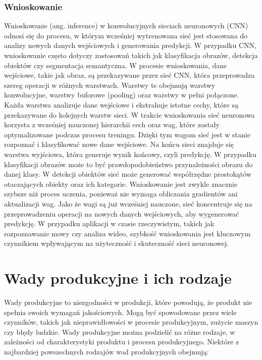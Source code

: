 \subsubsection{Wnioskowanie}
Wnioskowanie (ang. inference) w konwolucyjnych sieciach neuronowych (CNN) odnosi się do procesu, w którym wcześniej wytrenowana sieć jest stosowana do analizy nowych danych wejściowych i generowania predykcji. W przypadku CNN, wnioskowanie często dotyczy zastosowań takich jak klasyfikacja obrazów, detekcja obiektów czy segmentacja semantyczna.
W procesie wnioskowania, dane wejściowe, takie jak obraz, są przekazywane przez sieć CNN, która przeprowadza szereg operacji w różnych warstwach. Warstwy te obejmują warstwy konwolucyjne, warstwy buforowe (pooling) oraz warstwy w pełni połączone. Każda warstwa analizuje dane wejściowe i ekstrahuje istotne cechy, które są przekazywane do kolejnych warstw sieci.
W trakcie wnioskowania sieć neuronowa korzysta z wcześniej nauczonej hierarchii cech oraz wag, które zostały optymalizowane podczas procesu treningu. Dzięki tym wagom sieć jest w stanie rozpoznać i klasyfikować nowe dane wejściowe.
Na końcu sieci znajduje się warstwa wyjściowa, która generuje wynik końcowy, czyli predykcję. W przypadku klasyfikacji obrazów może to być prawdopodobieństwo przynależności obrazu do danej klasy. W detekcji obiektów sieć może generować współrzędne prostokątów otaczających obiekty oraz ich kategorie.
Wnioskowanie jest zwykle znacznie szybsze niż proces uczenia, ponieważ nie wymaga obliczania gradientów ani aktualizacji wag. Jako że wagi są już wcześniej nauczone, sieć koncentruje się na przeprowadzeniu operacji na nowych danych wejściowych, aby wygenerować predykcję. W przypadku aplikacji w czasie rzeczywistym, takich jak rozpoznawanie mowy czy analiza wideo, szybkość wnioskowania jest kluczowym czynnikiem wpływającym na użyteczność i skuteczność sieci neuronowej.
\section{Wady produkcyjne i ich rodzaje}
Wady produkcyjne to niezgodności w produkcji, które powodują, że produkt nie spełnia swoich wymagań jakościowych. Mogą być spowodowane przez wiele czynników, takich jak nieprawidłowości w procesie produkcyjnym, zużycie maszyn czy błędy ludzkie. Wady produkcyjne można podzielić na różne rodzaje, w zależności od charakterystyki produktu i procesu produkcyjnego. Niektóre z najbardziej powszechnych rodzajów wad produkcyjnych obejmują:

